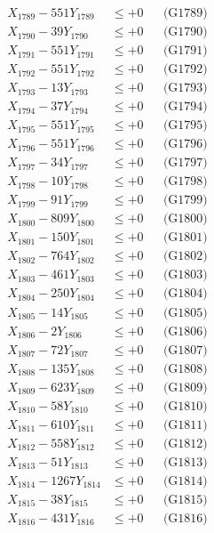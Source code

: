 \documentclass[a4paper,10pt]{article}
\begin{document}
{\begin{align}
X_{1789} - 551Y_{1789} &\leq +0 && \text{(G1789)} \\
X_{1790} - 39Y_{1790} &\leq +0 && \text{(G1790)} \\
\allowbreak
X_{1791} - 551Y_{1791} &\leq +0 && \text{(G1791)} \\
X_{1792} - 551Y_{1792} &\leq +0 && \text{(G1792)} \\
X_{1793} - 13Y_{1793} &\leq +0 && \text{(G1793)} \\
X_{1794} - 37Y_{1794} &\leq +0 && \text{(G1794)} \\
X_{1795} - 551Y_{1795} &\leq +0 && \text{(G1795)} \\
X_{1796} - 551Y_{1796} &\leq +0 && \text{(G1796)} \\
X_{1797} - 34Y_{1797} &\leq +0 && \text{(G1797)} \\
X_{1798} - 10Y_{1798} &\leq +0 && \text{(G1798)} \\
X_{1799} - 91Y_{1799} &\leq +0 && \text{(G1799)} \\
X_{1800} - 809Y_{1800} &\leq +0 && \text{(G1800)} \\
\allowbreak
X_{1801} - 150Y_{1801} &\leq +0 && \text{(G1801)} \\
X_{1802} - 764Y_{1802} &\leq +0 && \text{(G1802)} \\
X_{1803} - 461Y_{1803} &\leq +0 && \text{(G1803)} \\
X_{1804} - 250Y_{1804} &\leq +0 && \text{(G1804)} \\
X_{1805} - 14Y_{1805} &\leq +0 && \text{(G1805)} \\
X_{1806} - 2Y_{1806} &\leq +0 && \text{(G1806)} \\
X_{1807} - 72Y_{1807} &\leq +0 && \text{(G1807)} \\
X_{1808} - 135Y_{1808} &\leq +0 && \text{(G1808)} \\
X_{1809} - 623Y_{1809} &\leq +0 && \text{(G1809)} \\
X_{1810} - 58Y_{1810} &\leq +0 && \text{(G1810)} \\
\allowbreak
X_{1811} - 610Y_{1811} &\leq +0 && \text{(G1811)} \\
X_{1812} - 558Y_{1812} &\leq +0 && \text{(G1812)} \\
X_{1813} - 51Y_{1813} &\leq +0 && \text{(G1813)} \\
X_{1814} - 1267Y_{1814} &\leq +0 && \text{(G1814)} \\
X_{1815} - 38Y_{1815} &\leq +0 && \text{(G1815)} \\
X_{1816} - 431Y_{1816} &\leq +0 && \text{(G1816)} \\

\end{align}}
\end{document}
